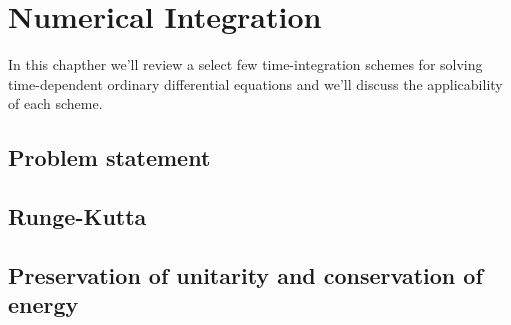 \chapter{Numerical Integration}
    In this chapther we'll review a select few time-integration schemes for
    solving time-dependent ordinary differential equations and we'll discuss the
    applicability of each scheme.

    \section{Problem statement}
    \section{Runge-Kutta}
    \section{Preservation of unitarity and conservation of energy}
